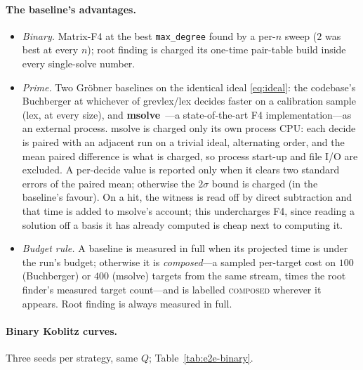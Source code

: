 \documentclass[10pt,a4paper]{article}
\theoremstyle{remark}
\newcommand{\code}[1]{\texttt{#1}}
\begin{document}
\paragraph{The baseline's advantages.}
\begin{itemize}
\item \emph{Binary.} Matrix-F4 at the best \code{max\_degree} found by
  a per-$n$ sweep ($2$ was best at every $n$); root finding is charged
  its one-time pair-table build inside every single-solve number.
\item \emph{Prime.} Two Gr\"obner baselines on the identical ideal
  \eqref{eq:ideal}: the codebase's Buchberger at whichever of
  grevlex/lex decides faster on a calibration sample (lex, at every
  size), and \textbf{msolve}~\cite{msolve2021}---a state-of-the-art F4
  implementation---as an external process. msolve is charged only its
  own process CPU: each decide is paired with an adjacent run on a
  trivial ideal, alternating order, and the mean paired difference is
  what is charged, so process start-up and file I/O are excluded. A
  per-decide value is reported only when it clears two standard errors
  of the paired mean; otherwise the $2\sigma$ bound is charged
  (in the baseline's favour). On a hit, the witness is read off by
  direct subtraction and that time is added to msolve's account; this
  undercharges F4, since reading a solution off a basis it has already
  computed is cheap next to computing it.
\item \emph{Budget rule.} A baseline is measured in full when its
  projected time is under the run's budget; otherwise it is
  \emph{composed}---a sampled per-target cost on $100$ (Buchberger) or
  $400$ (msolve) targets from the same stream, times the root finder's
  measured target count---and is labelled \textsc{composed} wherever
  it appears. Root finding is always measured in full.
\end{itemize}

\paragraph{Binary Koblitz curves.} Three seeds per strategy, same
$Q$; Table~\ref{tab:e2e-binary}.
\end{document}
